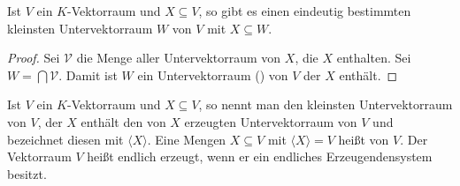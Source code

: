 \begin{proposition}
	Ist $V$ ein $K$-Vektorraum und $X \subseteq V$, so gibt es einen eindeutig bestimmten kleinsten Untervektorraum $W$ von $V$
	mit $X \subseteq W$.
\end{proposition}
\begin{proof}
	Sei $\mathcal V$ die Menge aller Untervektorraum von $X$, die $X$ enthalten. Sei $W=\bigcap \mathcal V$. Damit ist 
	$W$ ein Untervektorraum () von $V$ der $X$ enthält.
\end{proof}

\begin{definition}[Erzeugendensystem]
	Ist $V$ ein $K$-Vektorraum und $X\subseteq V$, so nennt man den kleinsten Untervektorraum von 
	$V$, der $X$ enthält den von $X$ erzeugten Untervektorraum von $V$ und bezeichnet diesen mit $\langle X\rangle$. Eine Mengen $X\subseteq V$ 
	mit $\langle X\rangle=V$ heißt  von $V$. Der Vektorraum $V$ heißt endlich erzeugt, wenn er ein endliches Erzeugendensystem 
	besitzt.
\end{definition}
